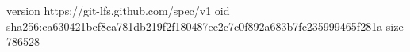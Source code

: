 version https://git-lfs.github.com/spec/v1
oid sha256:ca630421bcf8ca781db219f2f180487ee2c7c0f892a683b7fc235999465f281a
size 786528
